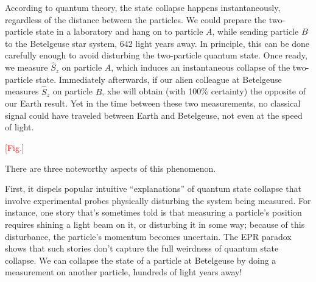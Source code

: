 \documentclass[pra,11pt]{revtex4}
\begin{document}
According to quantum theory, the state collapse happens
instantaneously, regardless of the distance between the particles.  We
could prepare the two-particle state in a laboratory and hang on to
particle $A$, while sending particle $B$ to the Betelgeuse star
system, 642 light years away.  In principle, this can be done
carefully enough to avoid disturbing the two-particle quantum state.
Once ready, we measure $\hat{S}_z$ on particle $A$, which induces an
instantaneous collapse of the two-particle state.  Immediately
afterwards, if our alien colleague at Betelgeuse measures $\hat{S}_z$
on particle $B$, xhe will obtain (with 100\% certainty) the opposite
of our Earth result.  Yet in the time between these two measurements,
no classical signal could have traveled between Earth and Betelgeuse,
not even at the speed of light.

\textcolor{red}{[Fig.]}

There are three noteworthy aspects of this phenomenon.

First, it dispels popular intuitive ``explanations'' of quantum state
collapse that involve experimental probes physically disturbing the
system being measured.  For instance, one story that's sometimes told
is that measuring a particle's position requires shining a light beam
on it, or disturbing it in some way; because of this disturbance, the
particle's momentum becomes uncertain.  The EPR paradox shows that
such stories don't capture the full weirdness of quantum state
collapse.  We can collapse the state of a particle at Betelgeuse by
doing a measurement on another particle, hundreds of light years away!
\end{document}
